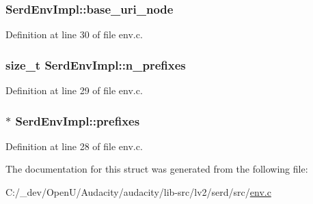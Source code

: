 \subsubsection[{\texorpdfstring{base\+\_\+uri\+\_\+node}{base_uri_node}}]{ Serd\+Env\+Impl\+::base\+\_\+uri\+\_\+node}\hypertarget{struct_serd_env_impl_af7ea84f52cd19c49647302d0e2942b84}{}\label{struct_serd_env_impl_af7ea84f52cd19c49647302d0e2942b84}


Definition at line 30 of file env.\+c.

\subsubsection[{\texorpdfstring{n\+\_\+prefixes}{n_prefixes}}]{\setlength{\rightskip}{0pt plus 5cm}size\+\_\+t Serd\+Env\+Impl\+::n\+\_\+prefixes}\hypertarget{struct_serd_env_impl_ade5f0b3ae658bb11b34cebb1ccfa2fa4}{}\label{struct_serd_env_impl_ade5f0b3ae658bb11b34cebb1ccfa2fa4}


Definition at line 29 of file env.\+c.

\subsubsection[{\texorpdfstring{prefixes}{prefixes}}]{$\ast$ Serd\+Env\+Impl\+::prefixes}\hypertarget{struct_serd_env_impl_a3ff80ef06baff51d8783d8b2cd060310}{}\label{struct_serd_env_impl_a3ff80ef06baff51d8783d8b2cd060310}


Definition at line 28 of file env.\+c.



The documentation for this struct was generated from the following file\+:\begin{DoxyCompactItemize}
\item 
C\+:/\+\_\+dev/\+Open\+U/\+Audacity/audacity/lib-\/src/lv2/serd/src/\hyperlink{env_8c}{env.\+c}\end{DoxyCompactItemize}
